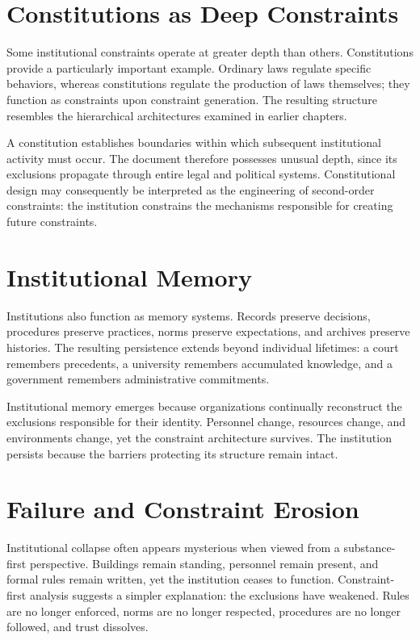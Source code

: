 \documentclass[11pt,oneside]{book}
\theoremstyle{plain}
\theoremstyle{definition}
\theoremstyle{remark}
\begin{document}
\section{Constitutions as Deep Constraints}

Some institutional constraints operate at greater depth than others. Constitutions provide a particularly important example. Ordinary laws regulate specific behaviors, whereas constitutions regulate the production of laws themselves; they function as constraints upon constraint generation. The resulting structure resembles the hierarchical architectures examined in earlier chapters.

A constitution establishes boundaries within which subsequent institutional activity must occur. The document therefore possesses unusual depth, since its exclusions propagate through entire legal and political systems. Constitutional design may consequently be interpreted as the engineering of second-order constraints: the institution constrains the mechanisms responsible for creating future constraints.

\section{Institutional Memory}

Institutions also function as memory systems. Records preserve decisions, procedures preserve practices, norms preserve expectations, and archives preserve histories. The resulting persistence extends beyond individual lifetimes: a court remembers precedents, a university remembers accumulated knowledge, and a government remembers administrative commitments.

Institutional memory emerges because organizations continually reconstruct the exclusions responsible for their identity. Personnel change, resources change, and environments change, yet the constraint architecture survives. The institution persists because the barriers protecting its structure remain intact.

\section{Failure and Constraint Erosion}

Institutional collapse often appears mysterious when viewed from a substance-first perspective. Buildings remain standing, personnel remain present, and formal rules remain written, yet the institution ceases to function. Constraint-first analysis suggests a simpler explanation: the exclusions have weakened. Rules are no longer enforced, norms are no longer respected, procedures are no longer followed, and trust dissolves.
\end{document}
